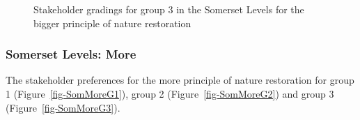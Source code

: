 \documentclass[
  12pt,
  letterpaper,
  DIV=11,
  numbers=noendperiod]{scrartcl}
\begin{document}
\begin{figure}[H]


\caption{\label{fig-SomBigG3}Stakeholder gradings for group 3 in the
Somerset Levels for the bigger principle of nature restoration}

\end{figure}%

\newpage{}

\subsubsection{Somerset Levels: More}\label{somerset-levels-more}

The stakeholder preferences for the more principle of nature restoration
for group 1 (Figure~\ref{fig-SomMoreG1}), group 2
(Figure~\ref{fig-SomMoreG2}) and group 3 (Figure~\ref{fig-SomMoreG3}).
\end{document}
